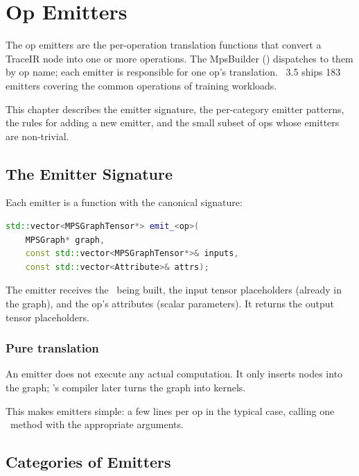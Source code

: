 \chapter{Op Emitters}
\label{ch:op_emitters}

The op emitters are the per-operation translation functions that
convert a TraceIR node into one or more 
operations. The MpsBuilder () dispatches
to them by op name; each emitter is responsible for one op's
translation. \Lucid\ 3.5 ships 183 emitters covering the common
operations of training workloads.

This chapter describes the emitter signature, the per-category
emitter patterns, the rules for adding a new emitter, and the
small subset of ops whose emitters are non-trivial.

\section{The Emitter Signature}
\label{sec:op_emitters:signature}

Each emitter is a function with the canonical signature:

\begin{lstlisting}[style=lucidcpp,language=C++]
std::vector<MPSGraphTensor*> emit_<op>(
    MPSGraph* graph,
    const std::vector<MPSGraphTensor*>& inputs,
    const std::vector<Attribute>& attrs);
\end{lstlisting}

The emitter receives the \MPSGraph\ being built, the input
tensor placeholders (already in the graph), and the op's
attributes (scalar parameters). It returns the output tensor
placeholders.

\subsection{Pure translation}
\label{ssec:op_emitters:pure_translation}

An emitter does not execute any actual computation. It only
inserts  nodes into the graph; \MPSGraph's
compiler later turns the graph into kernels.

This makes emitters simple: a few lines per op in the typical
case, calling one \MPSGraph\ method with the appropriate
arguments.

\section{Categories of Emitters}
\label{sec:op_emitters:categories}

